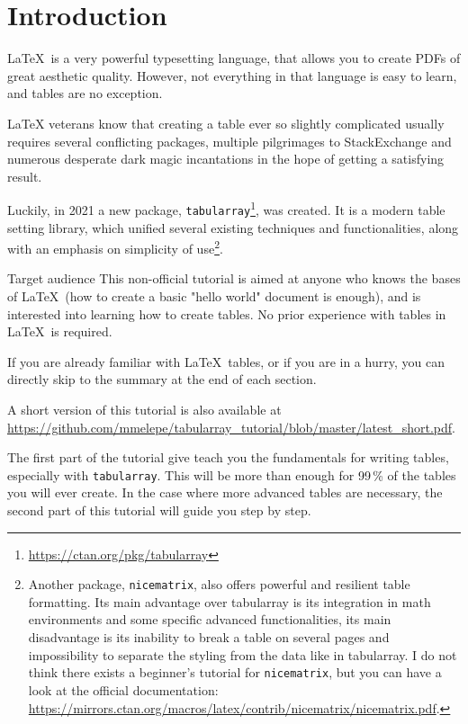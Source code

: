 \documentclass[oneside]{book}
\newcommand{\ShortVersion}{\url{https://github.com/mmelepe/tabularray_tutorial/blob/master/latest_short.pdf}}
\begin{document}
	


\chapter*{Introduction}
\LaTeX\ is a very powerful typesetting language, that allows you to create PDFs of great aesthetic quality. However, not everything in that language is easy to learn, and tables are no exception. 

LaTeX veterans know that creating a table ever so slightly complicated usually requires several conflicting packages, multiple pilgrimages to StackExchange and numerous desperate dark magic incantations in the hope of getting a satisfying result.

Luckily, in 2021 a new package, \texttt{tabularray}\footnote{\url{https://ctan.org/pkg/tabularray}}, was created. It is a modern table setting library, which unified several existing techniques and functionalities, along with an emphasis on simplicity of use\footnote{Another package, \texttt{nicematrix}, also offers powerful and resilient table formatting. Its main advantage over tabularray is its integration in math environments and some specific advanced functionalities, its main disadvantage is its inability to break a table on several pages and impossibility to separate the styling from the data like in tabularray. I do not think there exists a beginner's tutorial for \texttt{nicematrix}, but you can have a look at the official documentation: \url{https://mirrors.ctan.org/macros/latex/contrib/nicematrix/nicematrix.pdf}.}.

\begin{infobox}{Target audience}
This non-official tutorial is aimed at anyone who knows the bases of \LaTeX\ (how to create a basic "hello world" document is enough), and is interested into learning how to create tables. No prior experience with tables in \LaTeX\ is required.

If you are already familiar with \LaTeX\ tables, or if you are in a hurry, you can directly skip to the summary at the end of each section.

A short version of this tutorial is also available at \ShortVersion.
\end{infobox}

The first part of the tutorial give teach you the fundamentals for writing tables, especially with \texttt{tabularray}. This will be more than enough for 99\,\% of the tables you will ever create. In the case where more advanced tables are necessary, the second part of this tutorial will guide you step by step.
\end{document}
